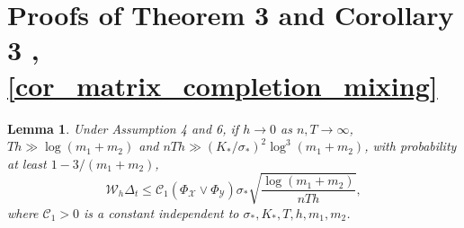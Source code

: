 \documentclass[12pt]{article}
\newtheorem{lemma}{Lemma}
\begin{document}
\section{Proofs of %
Theorem 3 and Corollary 3%
, \ref{cor_matrix_completion_mixing}}
\begin{lemma}
  \label{lem_lambda_dependent}
  Under Assumption 4 and 6, if $h\rightarrow0$ as $n,T\rightarrow\infty$, $Th\gg\log(m_1+m_2)$ and $nTh \gg \left(K_*/\sigma_*\right)^2\log^3 (m_1+m_2)$, with probability at least $1-3/(m_1+m_2)$,
   \begin{equation*}%
  \mathcal{W}_h\Delta_{t}  \le \mathcal{C}_1 (\Phi_{\mathcal{X}}\vee \Phi_{\mathcal{Y}})\sigma_* \sqrt{\frac{\log (m_1+m_2)}{nTh}},
  \end{equation*}
  where $\mathcal{C}_1>0$ is a constant independent to $\sigma_*,K_*,T,h,m_1,m_2$.
  \end{lemma}
\end{document}
